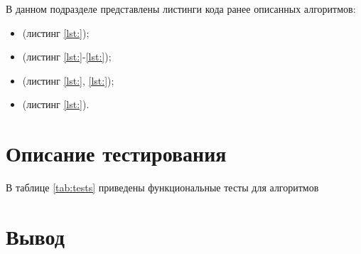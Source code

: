 В данном подразделе представлены листинги кода ранее описанных алгоритмов:
\begin{itemize}[left=\parindent]
    \item (листинг \ref{lst:});
    \item (листинг \ref{lst:}-\ref{lst:});
    \item (листинг \ref{lst:}, \ref{lst:});
    \item (листинг \ref{lst:}).
\end{itemize}


\section{Описание тестирования}

В таблице \ref{tab:tests} приведены функциональные тесты для алгоритмов


\clearpage

\section{Вывод}

